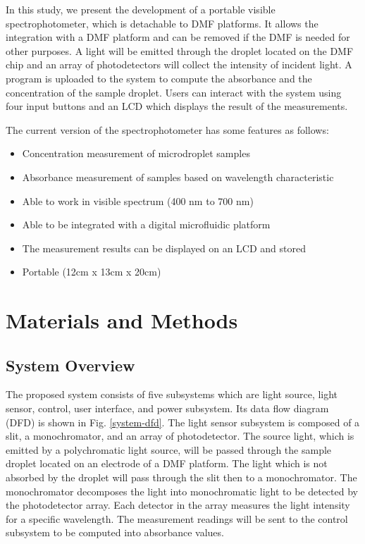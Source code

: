 \documentclass[conference]{IEEEtran}
\begin{document}
In this study, we present the development of a portable visible spectrophotometer, which is detachable to DMF platforms. It allows the integration with a DMF platform and can be removed if the DMF is needed for other purposes. A light will be emitted through the droplet located on the DMF chip and an array of photodetectors will collect the intensity of incident light. A program is uploaded to the system to compute the absorbance and the concentration of the sample droplet. Users can interact with the system using four input buttons and an LCD which displays the result of the measurements. 

The current version of the spectrophotometer has some features as follows:
\begin{itemize}
    \item Concentration measurement of microdroplet samples 
    \item Absorbance measurement of samples based on wavelength characteristic 
    \item Able to work in visible spectrum (400 nm to 700 nm) 
    \item Able to be integrated with a digital microfluidic platform 
    \item The measurement results can be displayed on an LCD and stored 
    \item Portable (12cm x 13cm x 20cm)
\end{itemize}

\section{Materials and Methods}
\subsection{System Overview}
The proposed system consists of five subsystems which are light source, light sensor, control, user interface, and power subsystem. Its data flow diagram (DFD) is shown in Fig. \ref{system-dfd}. The light sensor subsystem is composed of a slit, a monochromator, and an array of photodetector. The source light, which is emitted by a polychromatic light source, will be passed through the sample droplet located on an electrode of a DMF platform. The light which is not absorbed by the droplet will pass through the slit then to a monochromator. The monochromator decomposes the light into monochromatic light to be detected by the photodetector array. Each detector in the array measures the light intensity for a specific wavelength. The measurement readings will be sent to the control subsystem to be computed into absorbance values. 
\end{document}
